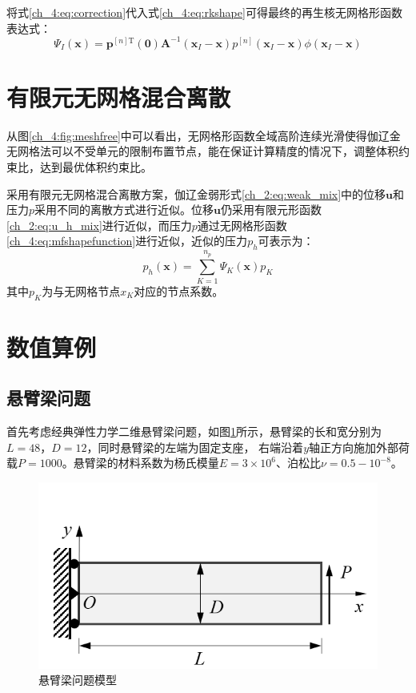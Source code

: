 将式\eqref{ch_4:eq:correction}代入式\eqref{ch_4:eq:rkshape}可得最终的再生核无网格形函数表达式：
\begin{equation}\label{ch_4:eq:mfshapefunction}
    \Psi_I(\boldsymbol x) = \boldsymbol p^{[n]\mathrm{T}}(\boldsymbol 0) \boldsymbol A^{-1}(\boldsymbol x_I-\boldsymbol x)p^{[n]}(\boldsymbol x_I-\boldsymbol x)\phi(\boldsymbol x_I-\boldsymbol x)
\end{equation}

\section{有限元无网格混合离散}
从图\ref{ch_4:fig:meshfree}中可以看出，无网格形函数全域高阶连续光滑使得伽辽金无网格法可以不受单元的限制布置节点，能在保证计算精度的情况下，调整体积约束比，达到最优体积约束比。

采用有限元无网格混合离散方案，伽辽金弱形式\eqref{ch_2:eq:weak_mix}中的位移$\boldsymbol{u}$和压力$p$采用不同的离散方式进行近似。位移$\boldsymbol{u}$仍采用有限元形函数\eqref{ch_2:eq:u_h_mix}进行近似，而压力$p$通过无网格形函数\eqref{ch_4:eq:mfshapefunction}进行近似，近似的压力$p_h$可表示为：
\begin{equation}
    p_h(\boldsymbol x) = \sum_{K=1}^{n_p} \Psi_K(\boldsymbol x) p_K
\end{equation}
其中$p_K$为与无网格节点$x_K$对应的节点系数。

\section{数值算例}
\subsection{悬臂梁问题}

首先考虑经典弹性力学二维悬臂梁问题，如图\ref{ch_4:fig:cantilever}所示，悬臂梁的长和宽分别为$L=48$，$D=12$，同时悬臂梁的左端为固定支座，
右端沿着$y$轴正方向施加外部荷载$P=1000$。悬臂梁的材料系数为杨氏模量$E=3\times10^6$、泊松比$\nu=0.5-10^{-8}$。
\begin{figure}[!h]
    \centering 
        \includegraphics[scale=1.0]{figures/cantilever.png}
        \caption{悬臂梁问题模型}\label{ch_4:fig:cantilever}
\end{figure}


